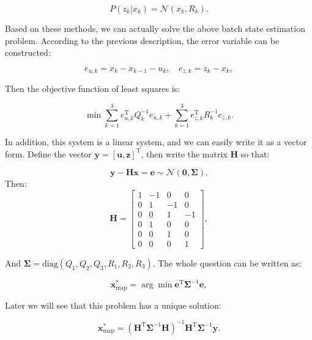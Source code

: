 \begin{equation}
P\left( {{z_k}|{x_k}} \right) = \mathcal{N}\left( {{x_k},{R_k}} \right).
\end{equation}

Based on these methods, we can actually solve the above batch state estimation problem. According to the previous description, the error variable can be constructed:

\begin{equation}
{e_{u,k}} = {x_k} - {x_{k - 1}} - {u_k}, \quad {e_{z,k}} = {z_k} - {x_k},
\end{equation}

Then the objective function of least squares is:

\begin{equation}
\min \sum\limits_{k = 1}^3 {e_{u,k}^\mathrm{T} Q_k^{ - 1}{e_{u,k}}} + \sum\limits_{k = 1 }^3 {e_{z,k}^\mathrm{T}{R^{ - 1}_k}{e_{z,k}}}. 
\end{equation}

In addition, this system is a linear system, and we can easily write it as a vector form. Define the vector $\bm{y}=[\bm{u}, \bm{z}]^\mathrm{T}$, then write the matrix $\bm{H}$ so that:

\begin{equation}
\bm{y}-\bm{H}\bm{x} = \bm{e} \sim \mathcal{N}(\bm{0}, \boldsymbol{\Sigma}).
\end{equation}
Then:
\begin{equation}
\bm{H} = \left[ {\begin{array}{*{20}{c}}
	1&{ - 1}&0&0\\
	0&1&{ - 1}&0\\
	0&0&1&{ - 1}\\
	\hline
	0&1&0&0\\
	0&0&1&0\\
	0&0&0&1
	\end{array}} \right],
\end{equation}

And $\boldsymbol{\Sigma}=\mathrm{diag}(Q_1, Q_2, Q_3, R_1, R_2, R_3)$. The whole question can be written as:

\begin{equation}
\bm{x}^*_{\mathrm{map}} = \arg \min \bm{e}^\mathrm{T} \boldsymbol{\Sigma}^{-1} \bm{e},
\end{equation}

Later we will see that this problem has a unique solution:

\begin{equation}
\bm{x}^*_{\mathrm{map}} = (\bm{H}^\mathrm{T} \boldsymbol{\Sigma}^{-1} \bm{H})^{-1} \bm{H}^\mathrm{T} \boldsymbol{\Sigma}^{-1} \bm{y}.
\end{equation}
